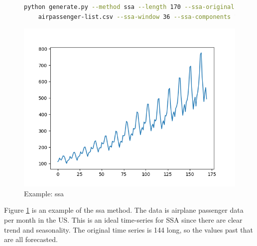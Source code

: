 \begin{figure}
\begin{lstlisting}[language=bash]
    python generate.py --method ssa --length 170 --ssa-original \
    airpassenger-list.csv --ssa-window 36 --ssa-components 13 --display
\end{lstlisting}
\includegraphics[scale=0.7]{figures/ssa}
\caption{Example: ssa}    
\label{fig:ssa-example}
\end{figure}

Figure \ref{fig:ssa-example} is an example of the ssa method. The data is airplane passenger data per month in the US. This is an ideal time-series for SSA since there are clear trend and seasonality. The original time series is 144 long, so the values past that are all forecasted.
